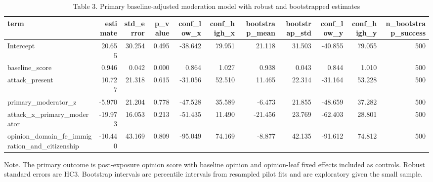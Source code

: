 \begin{table}[htbp]
\centering
\begin{threeparttable}
\caption{Table 3. Primary baseline-adjusted moderation model with robust and bootstrapped estimates}
\label{tab:primary_model}
\small
\begin{tabular}{lrrrrrrrrrr}
\toprule
term & estimate & std\_error & p\_value & conf\_low\_x & conf\_high\_x & bootstrap\_mean & bootstrap\_std & conf\_low\_y & conf\_high\_y & n\_bootstrap\_success \\
\midrule
Intercept & 20.655 & 30.254 & 0.495 & -38.642 & 79.951 & 21.118 & 31.503 & -40.855 & 79.055 & 500 \\
baseline\_score & 0.946 & 0.042 & 0.000 & 0.864 & 1.027 & 0.938 & 0.043 & 0.844 & 1.010 & 500 \\
attack\_present & 10.727 & 21.318 & 0.615 & -31.056 & 52.510 & 11.465 & 22.314 & -31.164 & 53.228 & 500 \\
primary\_moderator\_z & -5.970 & 21.204 & 0.778 & -47.528 & 35.589 & -6.473 & 21.855 & -48.659 & 37.282 & 500 \\
attack\_x\_primary\_moderator & -19.973 & 16.053 & 0.213 & -51.435 & 11.490 & -21.456 & 23.769 & -62.403 & 28.801 & 500 \\
opinion\_domain\_fe\_immigration\_and\_citizenship & -10.440 & 43.169 & 0.809 & -95.049 & 74.169 & -8.877 & 42.135 & -91.612 & 74.812 & 500 \\
\bottomrule
\end{tabular}

\begin{tablenotes}[flushleft]\footnotesize\item Note. The primary outcome is post-exposure opinion score with baseline opinion and opinion-leaf fixed effects included as controls. Robust standard errors are HC3. Bootstrap intervals are percentile intervals from resampled pilot fits and are exploratory given the small sample.\end{tablenotes}
\end{threeparttable}
\end{table}